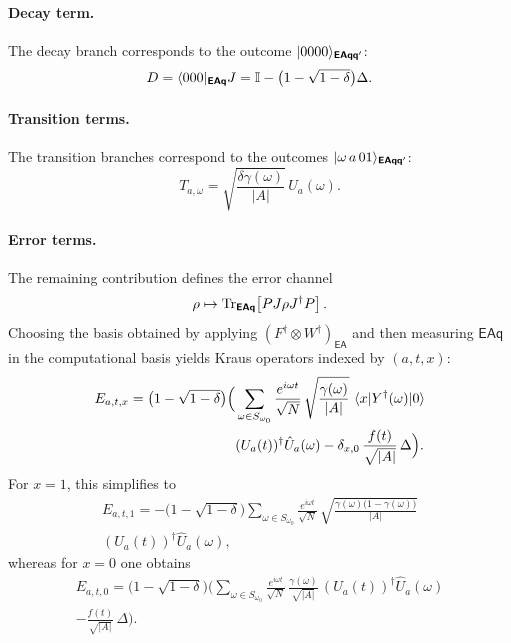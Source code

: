 \documentclass[showpacs,amsmath,amssymb,twocolumn,prx,superscriptaddress,10pt,aps,nofootinbib]{revtex4-2}
\DeclarePairedDelimiter\bra{\langle}{|}
\DeclarePairedDelimiter\ket{|}{\rangle}
\newcommand{\bbI}{\mathbb{I}}
\newcommand{\rE}{\boldsymbol{\mathsf{E}}}
\newcommand{\rA}{\boldsymbol{\mathsf{A}}}
\newcommand{\rqq}{\boldsymbol{\mathsf{q}}}
\begin{document}
\paragraph{Decay term.}
The decay branch corresponds to the outcome $\ket{0000}_{\rE\rA\rqq\rqq'}$:
\begin{equation}
    D = \bra{000}_{\rE\rA\rqq} J
    = \bbI - \bigl(1 - \sqrt{1-\delta}\bigr)\Delta.
\end{equation}

\paragraph{Transition terms.}
The transition branches correspond to the outcomes $\ket{\omega\, a\, 0 1}_{\rE\rA\rqq\rqq'}$:
\begin{equation}
    T_{a,\omega}
    =
    \sqrt{\frac{\delta \gamma(\omega)}{|A|}}\, \hat{U}_a(\omega).
\end{equation}

\paragraph{Error terms.}
The remaining contribution defines the error channel
\begin{equation}
    \rho \mapsto \Tr_{\rE\rA\rqq}\!\left[ P J \rho J^{\dagger} P \right].
\end{equation}
Choosing the basis obtained by applying $(F^{\dagger}\otimes W^{\dagger})_{\rE\rA}$ and then measuring $\rE\rA\rqq$ in the computational basis yields Kraus operators indexed by $(a,t,x)$:
\begin{equation}
\label{eq:error_kraus_qgs}
\begin{split}
    E_{a,t,x}
    =
    \bigl(1-\sqrt{1-\delta}\bigr)
    \Big(
    &\sum_{\omega\in S_{\omega_0}}
    \frac{e^{i \omega t}}{\sqrt{N}} \,
    \sqrt{\frac{\gamma(\omega)}{|A|}} \,
    \mel{x}{Y^{\dagger}(\omega)}{0} \\
    &(U_a(t))^{\dagger} \hat{U}_a(\omega)
    - \delta_{x,0}\,\frac{f(t)}{\sqrt{|A|}} \, \Delta
    \Big).
\end{split}
\end{equation}
For $x = 1$, this simplifies to
\begin{equation}
\begin{split}
    E_{a,t,1}
    =
    -
    \bigl(1-\sqrt{1-\delta}\bigr)
    \sum_{\omega\in S_{\omega_0}}
    \frac{e^{i \omega t}}{\sqrt{N}} \,
    \sqrt{\frac{\gamma(\omega)\bigl(1-\gamma(\omega)\bigr)}{|A|}} \\
    (U_a(t))^{\dagger} \hat{U}_a(\omega),
\end{split}
\end{equation}
whereas for $x=0$ one obtains
\begin{equation}
\begin{split}
    E_{a,t,0}
    =
    \bigl(1-\sqrt{1-\delta}\bigr)
    \bigl(
    \sum_{\omega\in S_{\omega_0}}
    \frac{e^{i \omega t}}{\sqrt{N}} \,
    \frac{\gamma(\omega)}{\sqrt{|A|}} \,
    (U_a(t))^{\dagger} \hat{U}_a(\omega)\\
    - \frac{f(t)}{\sqrt{|A|}} \, \Delta
    \bigr).
\end{split}
\end{equation}
\end{document}
